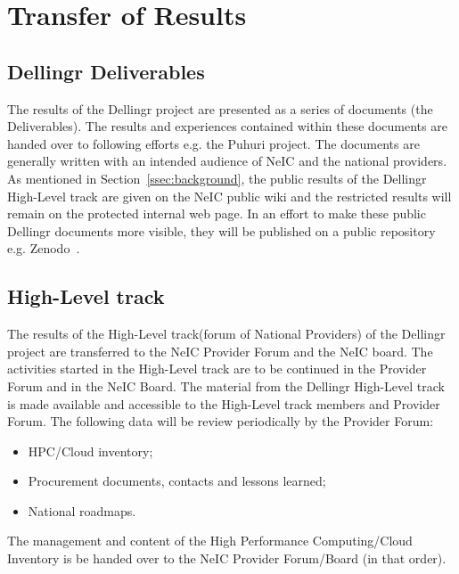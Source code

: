 \documentclass{article}
\newcommand{\dell}{Dellingr\xspace}
\newcommand{\np}{national provider\xspace}
\newcommand{\nps}{\np{s}\xspace}
\newcommand{\HLT}{High-Level track\xspace}
\begin{document}
\section{Transfer of Results}
\label{sec:transfer}

\subsection{\dell Deliverables}
\label{ssec:deliverables}

The results of the \dell project are presented as a series of documents (the Deliverables).
The results and experiences contained within these documents are handed over to following efforts e.g. the Puhuri project.
The documents are generally written with an intended audience of NeIC and the \nps.
As mentioned in Section~\ref{ssec:background}, the public results of the \dell \HLT are given on the NeIC public wiki
and the restricted results will remain on the protected internal web page.
In an effort to make these public \dell documents more visible, they will be published on a public repository e.g. Zenodo~\cite{zenodo}.

\subsection{\HLT}
\label{ssec:hlt}

The results of the \HLT (forum of National Providers) of the \dell project are transferred to the NeIC Provider Forum and the NeIC board.
The activities started in the \HLT are to be continued in the Provider Forum and in the NeIC Board.
The material from the \dell \HLT is made available and accessible to the \HLT members and Provider Forum.
The following data will be review periodically by the Provider Forum:
\begin{itemize}
\item HPC/Cloud inventory;
\item Procurement documents, contacts and lessons learned;
\item National roadmaps.
\end{itemize}
The management and content of the High Performance Computing/Cloud Inventory is be handed over to the NeIC Provider Forum/Board (in that order).
\end{document}
